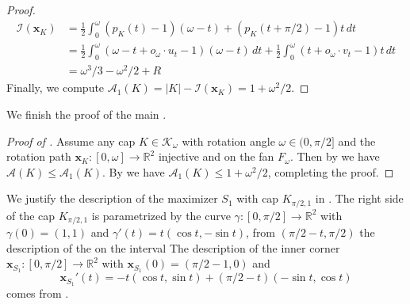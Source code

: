 \begin{proof}
\begin{align*}
\mathcal{I}(\mathbf{x}_{K}) & = \frac{1}{2} \int_0^\omega (p_{K}(t) - 1)(\omega - t) + (p_{K}(t+\pi/2) - 1) t \, dt  \\
& = \frac{1}{2} \int_0^\omega (\omega - t + o_{\omega} \cdot u_t - 1) (\omega - t) \, dt + 
\frac{1}{2} \int_0^\omega (t + o_{\omega} \cdot v_t - 1) t \, dt \\
& = \omega^3 / 3 - \omega^2 / 2 + R
\end{align*}
Finally, we compute \(\mathcal{A}_1(K) = |K| - \mathcal{I}(\mathbf{x}_{K}) = 1 + \omega^2 / 2\).
\end{proof}

We finish the proof of the main .

\begin{proof}[Proof of ]
Assume any cap \(K \in \mathcal{K}_\omega\) with rotation angle \(\omega \in (0, \pi/2]\) and the rotation path \(\mathbf{x}_K : [0, \omega] \to \mathbb{R}^2\) injective and on the fan \(F_\omega\). Then by  we have \(\mathcal{A}(K) \leq \mathcal{A}_1(K)\). By  we have \(\mathcal{A}_1(K) \leq 1 + \omega^2/2\), completing the proof.
\end{proof}

We justify the description of the maximizer \(S_1\) with cap \(K_{\pi/2, 1}\) in . The right side of the cap \(K_{\pi/2, 1}\) is parametrized by the curve \(\gamma : [0, \pi/2] \to \mathbb{R}^2\) with \(\gamma(0) = (1, 1)\) and \(\gamma'(t) = t(\cos t, -\sin t)\), from \((\pi/2 - t, \pi/2)\) the description of the on the interval  The description of the inner corner \(\mathbf{x}_{S_1} : [0, \pi/2] \to \mathbb{R}^2\) with \(\mathbf{x}_{S_1}(0) = (\pi/2-1, 0)\) and
\[
\mathbf{x}_{S_1}'(t) = -t (\cos t, \sin t) + (\pi/2- t) (-\sin t, \cos t)
\]
comes from .
